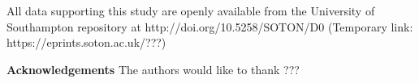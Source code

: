 \documentclass[runningheads,a4paper]{llncs}
\begin{document}
\vspace{-1 pt}

\begin{scriptsize}
	
	\par
	\noindent
	All data supporting this study are openly available from the University of Southampton repository at
	http://doi.org/10.5258/SOTON/D0 (Temporary link: https://eprints.soton.ac.uk/???)\\
	
	\par
	\noindent
	\textbf{Acknowledgements} The authors would like to thank ???
	
\end{scriptsize}




\end{document}

